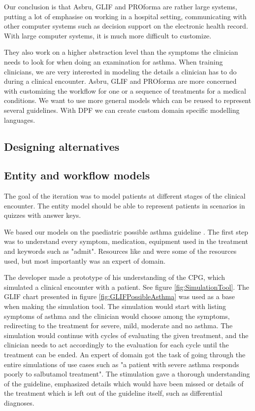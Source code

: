 Our conclusion is that Asbru, GLIF and PROforma are rather large systems, putting a lot of emphasise on working in a hospital setting, communicating with other computer systems such as decision support on the electronic health record. With large computer systems, it is much more difficult to customize.

They also work on a higher abstraction level than the symptoms the clinician needs to look for when doing an examination for asthma. When training clinicians, we are very interested in modeling the details a clinician has to do during a clinical encounter. Asbru, GLIF and PROforma are more concerned with customizing the workflow for one or a sequence of treatments for a medical conditions. We want to use more general models which can be reused to represent several guidelines. With DPF we can create custom domain specific modelling languages.


\subsection{Designing alternatives}

\subsection {Entity and workflow models}
The goal of the iteration was to model patients at different stages of the clinical encounter. The entity model should be able to represent patients in scenarios in quizzes with answer keys.

We based our models on the paediatric possible asthma guideline \parencite{RepublicofKeny2016}. The first step was to understand every symptom, medication, equipment used in the treatment and keywords such as "admit". Resources like \textcite{Disease2011} and \textcite{Johansen2018} were some of the resources used, but most importantly was an expert of domain. 

The developer made a prototype of his understanding of the CPG, which simulated a clinical encounter with a patient. See figure \ref{fig:SimulationTool}. The GLIF chart presented in figure \ref{fig:GLIFPossibleAsthma} was used as a base when making the simulation tool. The simulation would start with listing symptoms of asthma and the clinician would choose among the symptoms, redirecting to the treatment for severe, mild, moderate and no asthma. The simulation would continue with cycles of evaluating the given treatment, and the clinician needs to act accordingly to the evaluation for each cycle until the treatment can be ended. An expert of domain got the task of going through the entire simulations of use cases such as "a patient with severe asthma responds poorly to salbutamol treatment". The stimulation gave a thorough understanding of the guideline, emphasized details which would have been missed or details of the treatment which is left out of the guideline itself, such as differential diagnoses.

